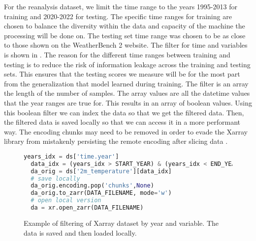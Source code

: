 For the reanalysis dataset, we limit the time range to the years 1995{-}2013 for training and 2020{-}2022 for testing. The specific time ranges for training are chosen to balance the diversity within the data and capacity of the machine the processing will be done on. The testing set time range was chosen to be as close to those shown on the WeatherBench 2 website. The filter for time and variables is shown in . The reason for the different time ranges between training and testing is to reduce the risk of information leakage across the training and testing sets. This ensures that the testing scores we measure will be for the most part from the generalization that model learned during training. The filter is an array the length of the number of samples. The array values are all the datetime values that the year ranges are true for. This results in an array of boolean values. Using this boolean filter we can index the data so that we get the filtered data. Then, the filtered data is saved locally so that we can access it in a more performant way. The encoding chunks may need to be removed in order to evade the Xarray library from mistakenly persisting the remote encoding after slicing data \autocite{ianZarrEncodingAttributes}.
\begin{figure}[H]
  \centering
  \begin{lstlisting}[language=Python]
  years_idx = ds['time.year']
  data_idx = (years_idx > START_YEAR) & (years_idx < END_YEAR)
  da_orig = ds['2m_temperature'][data_idx]
  # save locally
  da_orig.encoding.pop('chunks',None)
  da_orig.to_zarr(DATA_FILENAME, mode='w')
  # open local version
  da = xr.open_zarr(DATA_FILENAME)
  \end{lstlisting}
  \caption{Example of filtering of Xarray dataset by year and variable. The data is saved and then loaded locally.}\label{fig:wb2_retrieval}
\end{figure}

